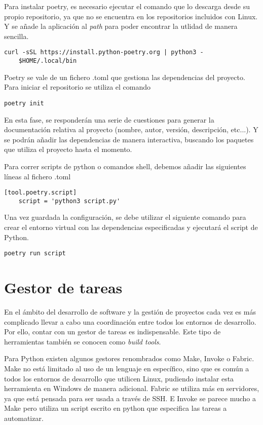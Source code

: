 Para instalar poetry, es necesario ejecutar el comando que lo descarga desde su propio repositorio, ya que no se encuentra en los repositorios incluidos con Linux. Y se añade la aplicación al \emph{path} para poder encontrar la utlidad de manera sencilla.
\begin{lstlisting}[style=consola]
	curl -sSL https://install.python-poetry.org | python3 -
	$HOME/.local/bin
\end{lstlisting}

Poetry se vale de un fichero .toml que gestiona las dependencias del proyecto. Para iniciar el repositorio se utiliza el comando
\begin{lstlisting}[style=consola]
	poetry init
\end{lstlisting}

En esta fase, se responderán una serie de cuestiones para generar la documentación relativa al proyecto (nombre, autor, versión, descripción, etc...). Y se podrán añadir las dependencias de manera interactiva, buscando los paquetes que utiliza el proyecto hasta el momento.

Para correr scripts de python o comandos shell, debemos añadir las siguientes líneas al fichero .toml
\begin{lstlisting}[style=consola]
	[tool.poetry.script]
	script = 'python3 script.py'
\end{lstlisting}

Una vez guardada la configuración, se debe utilizar el siguiente comando para crear el entorno virtual con las dependencias especificadas y ejecutará el script de Python. 
\begin{lstlisting}[style=consola]
	poetry run script
\end{lstlisting}

\section{Gestor de tareas}
En el ámbito del desarrollo de software y la gestión de proyectos cada vez es más complicado llevar a cabo una coordinación entre todos los entornos de desarrollo. Por ello, contar con un gestor de tareas es indispensable. Este tipo de herramientas también se conocen como \textit{build tools}. 

Para Python existen algunos gestores renombrados como Make, Invoke o Fabric. Make no está limitado al uso de un lenguaje en específico, sino que es común a todos los entornos de desarrollo que utilicen Linux, pudiendo instalar esta herramienta en Windows de manera adicional. Fabric se utiliza más en servidores, ya que está pensada para ser usada a través de SSH. E Invoke se parece mucho a Make pero utiliza un script escrito en python que especifica las tareas a automatizar. 

